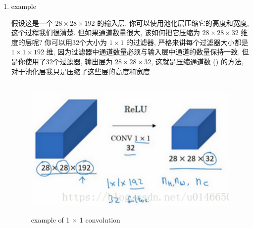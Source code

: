 \documentclass[12pt]{ctexart}%
\begin{document}
\begin{enumerate}
			 	\item example
			 	
			 		假设这是一个 $28 \times 28 \times 192$ 的输入层, 你可以使用池化层压缩它的高度和宽度, 这个过程我们很清楚. 但如果通道数量很大, 该如何把它压缩为 $28 \times 28 \times 32$ 维度的层呢? 你可以用32个大小为 $1 \times 1$ 的过滤器, 严格来讲每个过滤器大小都是 $1 \times 1 \times 192$ 维, 因为过滤器中通道数量必须与输入层中通道的数量保持一致.  但是你使用了32个过滤器, 输出层为 $28 \times 28 \times 32$, 这就是压缩通道数 () 的方法, 对于池化层我只是压缩了这些层的高度和宽度
						\begin{figure}[H]
							\vspace{-0.2cm}  %
							\setlength{\abovecaptionskip}{-0.2cm}   %
							\centering
							\includegraphics[scale=0.5]{example_network_in_network.png}
							\renewcommand{\figurename}{Fig} %
							\caption{example of 1 $\times$ 1 convolution}
							\label{fig14: example network in network}
						\end{figure}
					

\end{enumerate}
\end{document}
